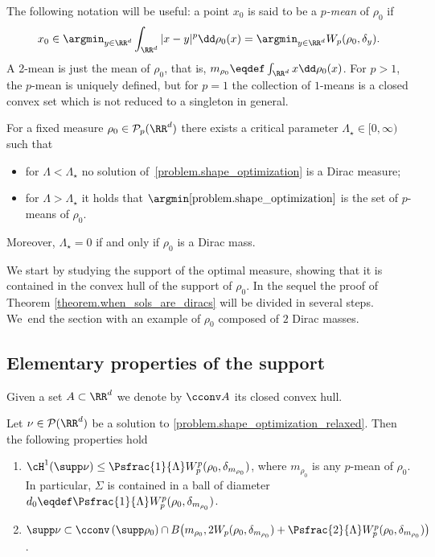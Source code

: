 The following notation will be useful: a point $x_0$ is said to be a \emph{$p$-mean} of $\rho_0$ if
\[
x_0 \in
\argmin_{y \in \RR^d} \int_{\RR^d}|x - y|^p\dd \rho_0(x)
=
\argmin_{y \in \RR^d} W_p(\rho_0, \delta_y).
\]
A 2-mean is just the mean of $\rho_0$, that is, $m_{\rho_0} \eqdef \int_{\RR^d}x \dd \rho_0(x)$. For $p>1$, the $p$-mean is uniquely defined, but for $p=1$ the collection of $1$-means is a closed convex set which is not reduced to a singleton in general.

\begin{theorem}\label{theorem.when_sols_are_diracs}
For a fixed measure $\rho_0 \in \mathcal{P}_p(\RR^d)$ there exists a critical parameter $\Lambda_\star \in [0, \infty)$ such that
\begin{itemize}
\item for $\Lambda < \Lambda_\star$ no solution of~\eqref{problem.shape_optimization}
is a Dirac measure;
\item for $\Lambda > \Lambda_\star$ it holds that
$\argmin\eqref{problem.shape_optimization}$
is the set of $p$-means of $\rho_0$.
\end{itemize}
Moreover, $\Lambda_\star=0$ if and only if $\rho_0$ is a Dirac mass.
\end{theorem}

We start by studying the support of the optimal measure, showing that it is contained in the convex hull of the support of $\rho_0$. In the sequel the proof of Theorem \ref{theorem.when_sols_are_diracs} will be divided in several steps. We~end the section with an example of $\rho_0$ composed of $2$ Dirac masses.

\subsection{Elementary properties of the support}
Given a set $A \subset \RR^d$ we denote by $\cconv A$ its closed convex hull.
\begin{lemma}\label{lem.convexhull}
Let $\nu \in\mathcal{P}(\RR^d)$ be a solution to \eqref{problem.shape_optimization_relaxed}. Then the following properties hold
\begin{enumerate}
\item
$\cH^1(\supp \nu)\leq \Psfrac{1}{\Lambda}W^p_p(\rho_0,\delta_{m_{\rho_0}})$, where $m_{\rho_0}$ is any $p$-mean of $\rho_0$. In particular, $\Sigma$ is contained in a ball of diameter $d_0\eqdef \Psfrac{1}{\Lambda}W^p_p(\rho_0,\delta_{m_{\rho_0}})$.
\item
$\supp \nu \subset \cconv\left(\supp \rho_0\right)
\cap B\big({m_{\rho_0}},2W_p(\rho_0,\delta_{m_{\rho_0}})
+ \Psfrac{2}{\Lambda}W_p^p(\rho_0,\delta_{m_{\rho_0}})\big)$.
\end{enumerate}
\end{lemma}

